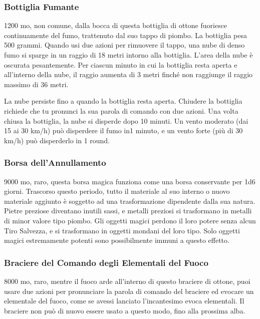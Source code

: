 \begin{multicols}{2}

	\medskip

	\subsubsection*{Bottiglia Fumante}
	1200 mo, non comune, dalla bocca di questa bottiglia di ottone fuoriesce continuamente del fumo, trattenuto dal suo tappo di piombo. La bottiglia pesa 500 grammi. Quando usi due azioni per rimuovere il tappo, una nube di denso fumo si sparge in un raggio di 18 metri intorno alla bottiglia. L'area della nube è oscurata pesantemente. Per ciascun minuto in cui la bottiglia resta aperta e all'interno della nube, il raggio aumenta di 3 metri finché non raggiunge il raggio massimo di 36 metri.

	La nube persiste fino a quando la bottiglia resta aperta. Chiudere la bottiglia richiede che tu pronunci la sua parola di comando con due azioni. Una volta chiusa la bottiglia, la nube si disperde dopo 10 minuti. Un vento moderato (dai 15 ai 30 km/h) può disperdere il fumo in1 minuto, e un vento forte (più di 30 km/h) può disperderlo in 1 round.

	\subsubsection*{Borsa dell'Annullamento}
	9000 mo, raro, questa borsa magica funziona come una borsa conservante per 1d6 giorni. Trascorso questo periodo, tutto il materiale al suo interno o nuovo materiale aggiunto è soggetto ad una trasformazione dipendente dalla sua natura. Pietre preziose diventano inutili sassi, e metalli preziosi si trasformano in metalli di minor valore tipo piombo. Gli oggetti magici perdono il loro potere senza alcun Tiro Salvezza, e si trasformano in oggetti mondani del loro tipo. Solo oggetti magici estremamente potenti sono possibilmente immuni a questo effetto.

	\subsubsection*{Braciere del Comando degli Elementali del Fuoco}
	8000 mo, raro, mentre il fuoco arde all'interno di questo braciere di ottone, puoi usare due azioni per pronunciare la parola di comando del braciere ed evocare un elementale del fuoco, come se avessi lanciato l'incantesimo evoca elementali. Il braciere non può di nuovo essere usato a questo modo, fino alla prossima alba.


\end{multicols}
